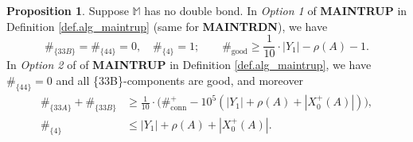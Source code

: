 \documentclass[10pt, reqno]{amsart}
\newcommand{\Mb}{\mathbb M}
\theoremstyle{definition}
\newtheorem{proposition}[theorem]{Proposition}
\theoremstyle{remark}
\numberwithin{equation}{section}
\begin{document}
\begin{proposition}
\label{prop.alg_maintrup} Suppose $\Mb$ has no double bond. In \emph{Option 1} of \textbf{MAINTRUP} in Definition \ref{def.alg_maintrup} (same for \textbf{MAINTRDN}), we have
\begin{equation}\label{eq.alg_maintrup_1}
\#_{\{33B\}}=\#_{\{44\}}=0,\quad \#_{\{4\}}=1;\qquad \#_{\mathrm{good}}\geq\frac{1}{10}\cdot |Y_1|-\rho(A)-1.
\end{equation}
 In \emph{Option 2} of of \textbf{MAINTRUP} in Definition \ref{def.alg_maintrup}, we have $\#_{\{44\}}=0$ and all \{33B\}-components are good, and moreover
\begin{equation}\label{eq.alg_maintrup_2}
\begin{aligned}
\#_{\{33A\}}+\#_{\{33B\}}&\geq\frac{1}{10}\cdot\big(\#_{\mathrm{conn}}^+-10^5(|Y_1|+\rho(A)+|X_0^+(A)|)\big),\\
\#_{\{4\}}&\leq |Y_1|+\rho(A)+|X_0^+(A)|.
\end{aligned}
\end{equation}
\end{proposition}
\end{document}
